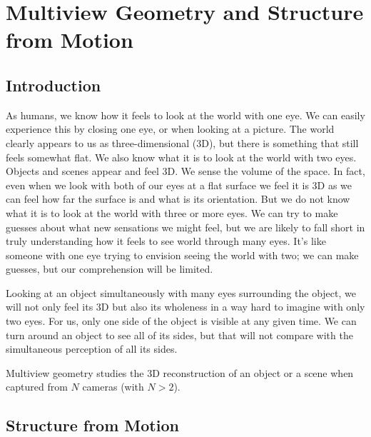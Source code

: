 \chapter{Multiview Geometry and Structure from Motion}
\label{chapter:3D_multiview}

\section{Introduction}

As humans, we know how it feels to look at the world with one eye. We can easily experience this by closing one eye, or when looking at a picture. The world clearly appears to us as three-dimensional (3D), but there is something that still feels somewhat flat. 
We also know what it is to look at the world with two eyes. Objects and scenes appear and feel 3D. We sense the volume of the space. In fact, even when we look with both of our eyes at a flat surface we feel it is 3D as we can feel how far the surface is and what is its orientation. 
But we do not know what it is to look at the world with three or more eyes. We can try to make guesses about what new sensations we might feel, but we are likely to fall short in truly understanding how it feels to see world through many eyes.  It's like someone with one eye trying to envision seeing the world with two; we can make guesses, but our comprehension will be limited.


Looking at an object simultaneously with many eyes surrounding the object, we will not only feel its 3D but also its wholeness in a way hard to imagine with only two eyes. For us, only one side of the object is visible at any given time. We can turn around an object to see all of its sides, but that will not compare with the simultaneous perception of all its sides. 

Multiview geometry studies the 3D reconstruction of an object or a scene when captured from $N$ cameras (with $N>2$). 


\section{Structure from Motion}

